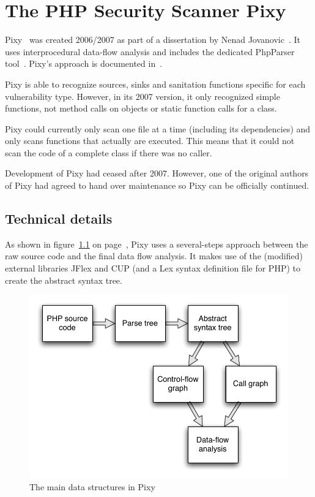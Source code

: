 \chapter{The PHP Security Scanner Pixy}
\label{pixy}
Pixy~\cite{pixy} was created 2006/2007 as part of a dissertation by Nenad Jovanovic~\cite{pixy-dissertation}. It uses interprocedural data-flow analysis and includes the dedicated PhpParser tool~\cite{phpparser}. Pixy's approach is documented in~\cite{pixy-short, pixy-long, pixy-technical, pixy-dissertation}.

Pixy is able to recognize sources, sinks and sanitation functions specific for each vulnerability type. However, in its 2007 version, it only recognized simple functions, not method calls on objects or static function calls for a class.

Pixy could currently only scan one file at a time (including its dependencies) and only scans functions that actually are executed. This means that it could not scan the code of a complete class if there was no caller.

Development of Pixy had ceased after 2007. However, one of the original authors of Pixy had agreed to hand over maintenance so Pixy can be officially continued.

\section{Technical details}

As shown in figure~\ref{fig:pixy-data-structures} on page~\pageref{fig:pixy-data-structures}, Pixy uses a several-steps approach between the raw source code and the final data flow analysis. It makes use of the (modified) external libraries JFlex and CUP (and a Lex syntax definition file for PHP) to create the abstract syntax tree.

\begin{figure}[!h]
 \includegraphics[scale=0.8]{images/Pixy-Arbeitsweise}
 \caption{The main data structures in Pixy}
 \label{fig:pixy-data-structures}
\end{figure}
